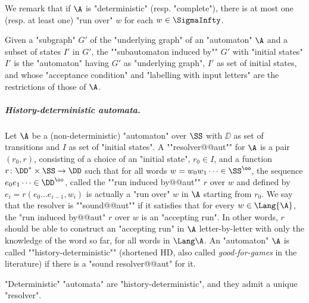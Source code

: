 \documentclass{theoretics}
\begin{document}
We remark that if $\A$ is "deterministic" (resp. "complete"), there is at most one (resp. at least one) "run over" $w$ for each $w\in \SigmaInfty$. 

\AP Given a "subgraph" $G'$ of the "underlying graph" of an "automaton" $\A$ and a subset of states $I'$ in $G'$, the ""subautomaton induced by"" $G'$ with "initial states" $I'$ is the "automaton" having $G'$ as "underlying graph", $I'$ as set of initial states, and whose "acceptance condition" and "labelling with input letters" are the restrictions of those of $\A$.


\subparagraph*{History-deterministic automata.} 
Let $\A$ be a (non-deterministic) "automaton" over $\SS$ with $\DD$ as set of transitions and $I$ as set of "initial states".
\AP A ""resolver@@aut"" for $\A$ is a pair $(r_0,r)$, consisting of a choice of an "initial state",\footnotemark{} $r_0\in I$, and a function $r\colon \DD^* \times \SS \to \DD$ such that for all words $w = w_0w_1\dots \in \SS^\oo$, the sequence $e_0e_1\dots \in \DD^\oo$, called the ""run induced by@@aut"" $r$ over $w$ and defined by $e_i = r(e_0\dots e_{i-1}, w_i)$ is actually a "run over" $w$ in $\A$ starting from $r_0$.
We say that the resolver is ""sound@@aut"" if it satisfies that for every $w\in \Lang{\A}$, the "run induced by@@aut" $r$ over $w$ is an "accepting run". 
In other words, $r$ should be able to construct an "accepting run" in $\A$ letter-by-letter with only the knowledge of the word so far, for all words in $\Lang \A$.
\AP An "automaton" $\A$ is called ""history-deterministic"" (shortened HD, also called \emph{good-for-games} in the literature) if there is a "sound resolver@@aut" for it.



\begin{remark}\label{rmk-prel:deterministic-implies-HD}
	"Deterministic" "automata" are "history-deterministic", and they admit a unique "resolver".
\end{remark}
\end{document}
